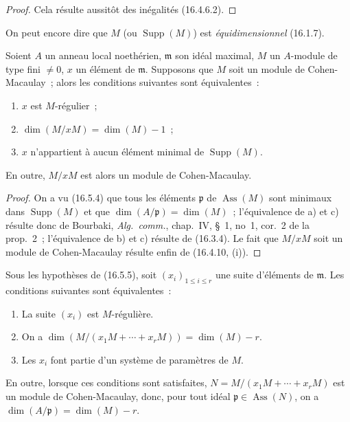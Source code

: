 \begin{proof}
Cela résulte aussitôt des inégalités (16.4.6.2).
\end{proof}

On peut encore dire que $M$ (ou $\operatorname{Supp}(M)$) est
\emph{équidimensionnel} (16.1.7).


\begin{proposition}[16.5.5]
\label{0.16.5.5-fr}
Soient $A$ un anneau local noethérien, $\mathfrak{m}$ son idéal maximal, $M$
un $A$-module de type fini $\neq0$, $x$ un élément de $\mathfrak{m}$.
Supposons que $M$ soit un module de Cohen-Macaulay~; alors les conditions
suivantes sont équivalentes~:
\begin{enumerate}
  \item[a)] $x$ est $M$-régulier~;
  \item[b)] $\dim(M/xM)=\dim(M)-1$~;
  \item[c)] $x$ n'appartient à aucun élément minimal de
  $\operatorname{Supp}(M)$.
\end{enumerate}
En outre, $M/xM$ est alors un module de Cohen-Macaulay.
\end{proposition}

\begin{proof}
On a vu (16.5.4) que tous les éléments $\mathfrak{p}$ de
$\operatorname{Ass}(M)$ sont minimaux dans $\operatorname{Supp}(M)$ et que
$\dim(A/\mathfrak{p})=\dim(M)$~; l'équivalence de a) et c) résulte donc de
Bourbaki, \emph{Alg.~comm.}, chap.~IV, \S~1, no~1, cor.~2 de la prop.~2~;
l'équivalence de b) et c) résulte de (16.3.4). Le fait que $M/xM$ soit un
module de Cohen-Macaulay résulte enfin de (16.4.10, (i)).
\end{proof}

\begin{corollary}[16.5.6]
\label{0.16.5.6-fr}
Sous les hypothèses de (16.5.5), soit $(x_i)_{1\leq i\leq r}$ une suite
d'éléments de $\mathfrak{m}$. Les conditions suivantes sont équivalentes~:
\begin{enumerate}
  \item[a)] La suite $(x_i)$ est $M$-régulière.
  \item[b)] On a
  $\dim(M/(x_1M+\cdots+x_rM))=\dim(M)-r$.
  \item[c)] Les $x_i$ font partie d'un système de paramètres de $M$.
\end{enumerate}
En outre, lorsque ces conditions sont satisfaites,
$N=M/(x_1M+\cdots+x_rM)$ est un module de Cohen-Macaulay, donc, pour tout
idéal $\mathfrak{p}\in\operatorname{Ass}(N)$, on a
$\dim(A/\mathfrak{p})=\dim(M)-r$.
\end{corollary}

